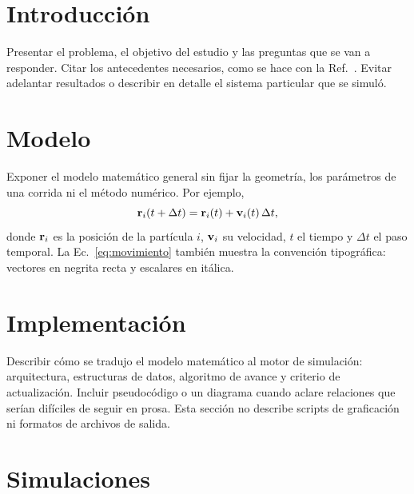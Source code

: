 \documentclass[11pt,a4paper]{article}
\begin{document}
\hypersetup{pageanchor=false}
\makereportcover
\setcounter{page}{1}
\hypersetup{pageanchor=true}

\begin{abstract}
. Resumir el problema, el modelo, el protocolo de
simulación y los resultados cuantitativos principales. El resumen no introduce
resultados que luego no aparezcan en el cuerpo del informe.
\end{abstract}

\section{Introducción}

Presentar el problema, el objetivo del estudio y las preguntas que se van a
responder. Citar los antecedentes necesarios, como se hace con la
Ref.~\cite{referencia-ejemplo}. Evitar adelantar resultados o describir en
detalle el sistema particular que se simuló.

\section{Modelo}

Exponer el modelo matemático general sin fijar la geometría, los parámetros de
una corrida ni el método numérico. Por ejemplo,
\begin{equation}
  \mathbf{r}_i(t+\Delta t)
  = \mathbf{r}_i(t) + \mathbf{v}_i(t)\,\Delta t,
  \label{eq:movimiento}
\end{equation}
donde \(\mathbf{r}_i\) es la posición de la partícula \(i\),
\(\mathbf{v}_i\) su velocidad, \(t\) el tiempo y \(\Delta t\) el paso temporal.
La Ec.~\eqref{eq:movimiento} también muestra la convención tipográfica:
vectores en negrita recta y escalares en itálica.

\section{Implementación}

Describir cómo se tradujo el modelo matemático al motor de simulación:
arquitectura, estructuras de datos, algoritmo de avance y criterio de
actualización. Incluir pseudocódigo o un diagrama cuando aclare relaciones que
serían difíciles de seguir en prosa. Esta sección no describe scripts de
graficación ni formatos de archivos de salida.

\section{Simulaciones}
\end{document}
